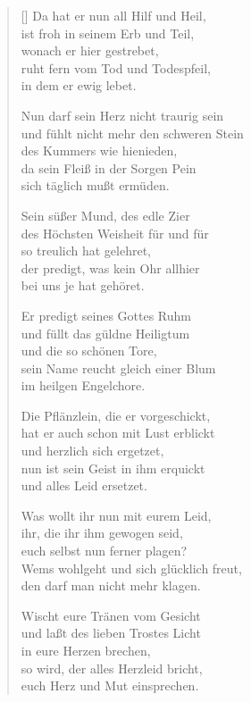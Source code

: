 \begin{multicols}{2}
\begin{verse}[\versewidth]
 Da hat er nun all Hilf und Heil,\\
ist froh in seinem Erb und Teil,\\
wonach er hier gestrebet,\\
ruht fern vom Tod und Todespfeil,\\
in dem er ewig lebet.

 Nun darf sein Herz nicht traurig sein\\
und fühlt nicht mehr den schweren Stein\\
des Kummers wie hienieden,\\
da sein Fleiß in der Sorgen Pein\\
sich täglich mußt ermüden.

 Sein süßer Mund, des edle Zier\\
des Höchsten Weisheit für und für\\
so treulich hat gelehret,\\
der predigt, was kein Ohr allhier\\
bei uns je hat gehöret.

 Er predigt seines Gottes Ruhm\\
und füllt das güldne Heiligtum\\
und die so schönen Tore,\\
sein Name reucht gleich einer Blum\\
im heilgen Engelchore.

 Die Pflänzlein, die er vorgeschickt,\\
hat er auch schon mit Lust erblickt\\
und herzlich sich ergetzet,\\
nun ist sein Geist in ihm erquickt\\
und alles Leid ersetzet.

 Was wollt ihr nun mit eurem Leid,\\
ihr, die ihr ihm gewogen seid,\\
euch selbst nun ferner plagen?\\
Wems wohlgeht und sich glücklich freut,\\
den darf man nicht mehr klagen.

 Wischt eure Tränen vom Gesicht\\
und laßt des lieben Trostes Licht\\
in eure Herzen brechen,\\
so wird, der alles Herzleid bricht,\\
euch Herz und Mut einsprechen.


\end{verse}
\end{multicols}
